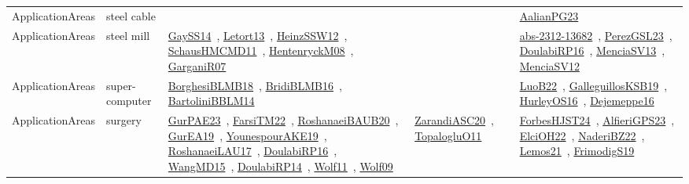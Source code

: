 {\begin{longtable}{lp{3cm}>{\raggedright\arraybackslash}p{6cm}>{\raggedright\arraybackslash}p{6cm}>{\raggedright\arraybackslash}p{8cm}}
ApplicationAreas & steel cable &  &  & \href{works/AalianPG23.pdf}{AalianPG23}~\cite{AalianPG23}\\
ApplicationAreas & steel mill & \href{works/GaySS14.pdf}{GaySS14}~\cite{GaySS14}, \href{works/Letort13.pdf}{Letort13}~\cite{Letort13}, \href{works/HeinzSSW12.pdf}{HeinzSSW12}~\cite{HeinzSSW12}, \href{works/SchausHMCMD11.pdf}{SchausHMCMD11}~\cite{SchausHMCMD11}, \href{works/HentenryckM08.pdf}{HentenryckM08}~\cite{HentenryckM08}, \href{works/GarganiR07.pdf}{GarganiR07}~\cite{GarganiR07} &  & \href{works/abs-2312-13682.pdf}{abs-2312-13682}~\cite{abs-2312-13682}, \href{works/PerezGSL23.pdf}{PerezGSL23}~\cite{PerezGSL23}, \href{works/DoulabiRP16.pdf}{DoulabiRP16}~\cite{DoulabiRP16}, \href{works/MenciaSV13.pdf}{MenciaSV13}~\cite{MenciaSV13}, \href{works/MenciaSV12.pdf}{MenciaSV12}~\cite{MenciaSV12}\\
ApplicationAreas & super-computer & \href{works/BorghesiBLMB18.pdf}{BorghesiBLMB18}~\cite{BorghesiBLMB18}, \href{works/BridiBLMB16.pdf}{BridiBLMB16}~\cite{BridiBLMB16}, \href{works/BartoliniBBLM14.pdf}{BartoliniBBLM14}~\cite{BartoliniBBLM14} &  & \href{works/LuoB22.pdf}{LuoB22}~\cite{LuoB22}, \href{works/GalleguillosKSB19.pdf}{GalleguillosKSB19}~\cite{GalleguillosKSB19}, \href{works/HurleyOS16.pdf}{HurleyOS16}~\cite{HurleyOS16}, \href{works/Dejemeppe16.pdf}{Dejemeppe16}~\cite{Dejemeppe16}\\
ApplicationAreas & surgery & \href{works/GurPAE23.pdf}{GurPAE23}~\cite{GurPAE23}, \href{works/FarsiTM22.pdf}{FarsiTM22}~\cite{FarsiTM22}, \href{works/RoshanaeiBAUB20.pdf}{RoshanaeiBAUB20}~\cite{RoshanaeiBAUB20}, \href{works/GurEA19.pdf}{GurEA19}~\cite{GurEA19}, \href{works/YounespourAKE19.pdf}{YounespourAKE19}~\cite{YounespourAKE19}, \href{works/RoshanaeiLAU17.pdf}{RoshanaeiLAU17}~\cite{RoshanaeiLAU17}, \href{works/DoulabiRP16.pdf}{DoulabiRP16}~\cite{DoulabiRP16}, \href{works/WangMD15.pdf}{WangMD15}~\cite{WangMD15}, \href{works/DoulabiRP14.pdf}{DoulabiRP14}~\cite{DoulabiRP14}, \href{works/Wolf11.pdf}{Wolf11}~\cite{Wolf11}, \href{works/Wolf09.pdf}{Wolf09}~\cite{Wolf09} & \href{works/ZarandiASC20.pdf}{ZarandiASC20}~\cite{ZarandiASC20}, \href{works/TopalogluO11.pdf}{TopalogluO11}~\cite{TopalogluO11} & \href{works/ForbesHJST24.pdf}{ForbesHJST24}~\cite{ForbesHJST24}, \href{works/AlfieriGPS23.pdf}{AlfieriGPS23}~\cite{AlfieriGPS23}, \href{works/ElciOH22.pdf}{ElciOH22}~\cite{ElciOH22}, \href{works/NaderiBZ22.pdf}{NaderiBZ22}~\cite{NaderiBZ22}, \href{works/Lemos21.pdf}{Lemos21}~\cite{Lemos21}, \href{works/FrimodigS19.pdf}{FrimodigS19}~\cite{FrimodigS19}\\

\end{longtable}}
